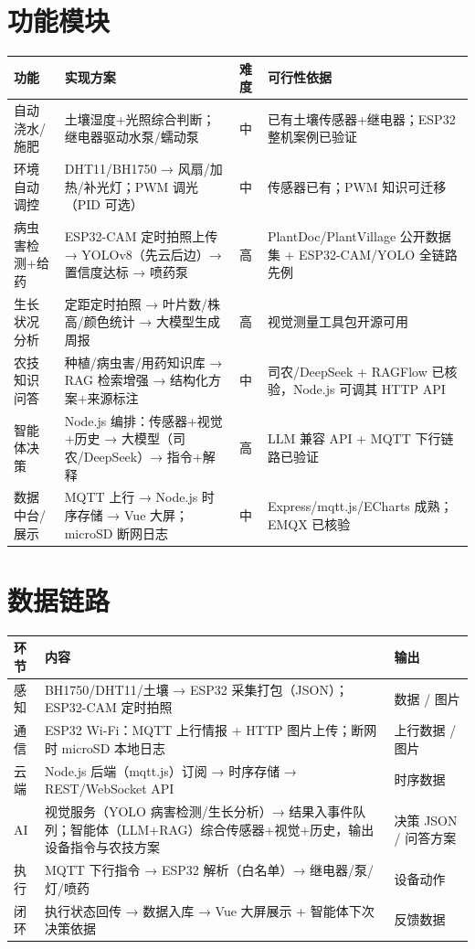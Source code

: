 \documentclass[11pt]{ctexart}
\begin{document}
\section{功能模块}
\begin{small}
\begin{longtable}{p{4.4cm}p{5.4cm}p{1.0cm}p{4.4cm}}
  \toprule
  功能 & 实现方案 & 难度 & 可行性依据 \\
  \midrule
  自动浇水/施肥 & 土壤湿度+光照综合判断；继电器驱动水泵/蠕动泵 & 中 & 已有土壤传感器+继电器；ESP32 整机案例已验证 \\
  环境自动调控 & DHT11/BH1750 → 风扇/加热/补光灯；PWM 调光（PID 可选） & 中 & 传感器已有；PWM 知识可迁移 \\
  病虫害检测+给药 & ESP32-CAM 定时拍照上传 → YOLOv8（先云后边）→ 置信度达标 → 喷药泵 & 高 & PlantDoc/PlantVillage 公开数据集 + ESP32-CAM/YOLO 全链路先例 \\
  生长状况分析 & 定距定时拍照 → 叶片数/株高/颜色统计 → 大模型生成周报 & 高 & 视觉测量工具包开源可用 \\
  农技知识问答 & 种植/病虫害/用药知识库 → RAG 检索增强 → 结构化方案+来源标注 & 中 & 司农/DeepSeek + RAGFlow 已核验，Node.js 可调其 HTTP API \\
  智能体决策 & Node.js 编排：传感器+视觉+历史 → 大模型（司农/DeepSeek）→ 指令+解释 & 高 & LLM 兼容 API + MQTT 下行链路已验证 \\
  数据中台/展示 & MQTT 上行 → Node.js 时序存储 → Vue 大屏；microSD 断网日志 & 中 & Express/mqtt.js/ECharts 成熟；EMQX 已核验 \\
  \bottomrule
\end{longtable}
\end{small}

\section{数据链路}
\begin{longtable}{p{1.5cm}p{11.0cm}p{2.6cm}}
  \toprule
  环节 & 内容 & 输出 \\
  \midrule
  感知 & BH1750/DHT11/土壤 → ESP32 采集打包（JSON）；ESP32-CAM 定时拍照 & 数据 / 图片 \\
  通信 & ESP32 Wi-Fi：MQTT 上行情报 + HTTP 图片上传；断网时 microSD 本地日志 & 上行数据 / 图片 \\
  云端 & Node.js 后端（mqtt.js）订阅 → 时序存储 → REST/WebSocket API & 时序数据 \\
  AI & 视觉服务（YOLO 病害检测/生长分析）→ 结果入事件队列；智能体（LLM+RAG）综合传感器+视觉+历史，输出设备指令与农技方案 & 决策 JSON / 问答方案 \\
  执行 & MQTT 下行指令 → ESP32 解析（白名单）→ 继电器/泵/灯/喷药 & 设备动作 \\
  闭环 & 执行状态回传 → 数据入库 → Vue 大屏展示 + 智能体下次决策依据 & 反馈数据 \\
  \bottomrule
\end{longtable}
\end{document}
